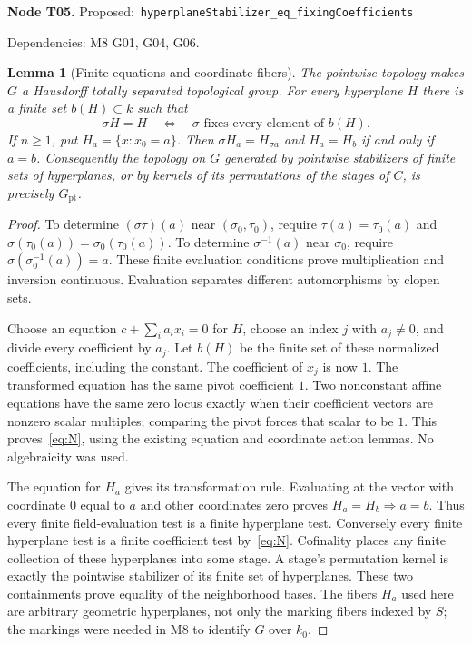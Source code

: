 \documentclass[11pt]{article}
\newtheorem{lemma}[theorem]{Lemma}
\theoremstyle{remark}\newtheorem{remark}[theorem]{Remark}
\newcommand{\code}[1]{{\normalfont\nolinkurl{#1}}}
\newcommand{\node}[3]{\par\Needspace{8\baselineskip}\smallskip\noindent\textbf{Node #1.}\quad
 \textsf{Proposed:}\ \code{#2}\par\noindent
 \textsf{Dependencies:} #3.\par\smallskip}
\begin{document}
\node{T05}{hyperplaneStabilizer_eq_fixingCoefficients}{M8 G01, G04, G06}
\begin{lemma}[Finite equations and coordinate fibers]\label{lem:t05}
The pointwise topology makes $G$ a Hausdorff totally separated
topological group.
For every hyperplane $H$ there is a finite set $b(H)\subset k$ such that
\[
                \sigma H=H\quad\Longleftrightarrow\quad
                \sigma\text{ fixes every element of }b(H).       \tag{N}\label{eq:N}
\]
If $n\geq1$, put $H_a=\{x:x_0=a\}$. Then
$\sigma H_a=H_{\sigma a}$ and $H_a=H_b$ if and only if $a=b$.
Consequently the topology on $G$ generated by pointwise stabilizers of
finite sets of hyperplanes, or by kernels of its permutations of the
stages of $C$, is precisely $G_{\mathrm{pt}}$.
\end{lemma}
\begin{proof}
To determine $(\sigma\tau)(a)$ near $(\sigma_0,\tau_0)$, require
$\tau(a)=\tau_0(a)$ and $\sigma(\tau_0(a))=\sigma_0(\tau_0(a))$.
To determine $\sigma^{-1}(a)$ near $\sigma_0$, require
$\sigma(\sigma_0^{-1}(a))=a$. These finite evaluation conditions
prove multiplication and inversion continuous. Evaluation separates
different automorphisms by clopen sets.

Choose an equation $c+\sum_i a_i x_i=0$ for $H$, choose an index $j$
with $a_j\ne0$, and divide every coefficient by $a_j$. Let $b(H)$ be
the finite set of these normalized coefficients, including the constant.
The coefficient of $x_j$ is now $1$. The transformed equation has the
same pivot coefficient $1$. Two nonconstant affine equations have the
same zero locus exactly when their coefficient vectors are nonzero
scalar multiples; comparing the pivot forces that scalar to be $1$.
This proves~\eqref{eq:N}, using the existing equation and coordinate
action lemmas. No algebraicity was used.

The equation for $H_a$ gives its transformation rule. Evaluating at
the vector with coordinate $0$ equal to $a$ and other coordinates zero
proves $H_a=H_b\Rightarrow a=b$. Thus every finite field-evaluation
test is a finite hyperplane test. Conversely every finite hyperplane
test is a finite coefficient test by~\eqref{eq:N}. Cofinality places
any finite collection of these hyperplanes into some stage. A stage's
permutation kernel is exactly the pointwise stabilizer of its finite
set of hyperplanes. These two containments prove equality of the
neighborhood bases. The fibers $H_a$ used here are arbitrary geometric
hyperplanes, not only the marking fibers indexed by $S$; the markings
were needed in M8 to identify $G$ over $k_0$.
\end{proof}
\end{document}
